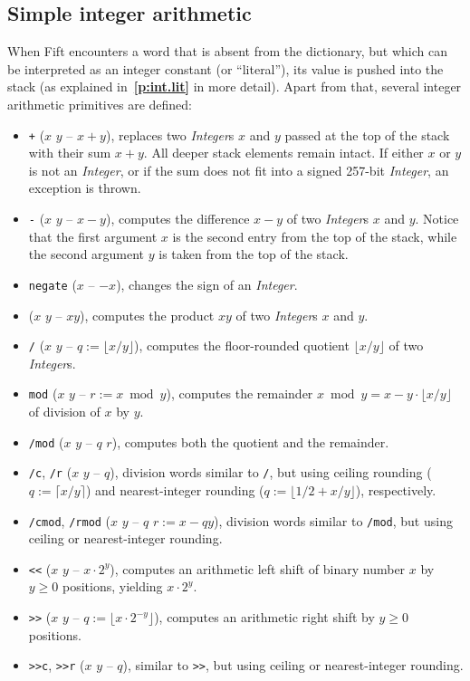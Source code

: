 \documentclass[12pt,oneside]{article}
\def\refpoint#1{{\rm\textbf{\ref{#1}}}}
\let\ptref=\refpoint
\def\mysubsection#1{\subsection{#1}\fancyhead[C]{\small{\textsc{\textrm{\thesubsection.} #1}}}}
\begin{document}
\mysubsection{Simple integer arithmetic}\label{p:arith.op}
When Fift encounters a word that is absent from the dictionary, but which can be interpreted as an integer constant (or ``literal''), its value is pushed into the stack (as explained in~\ptref{p:int.lit} in more detail). Apart from that, several integer arithmetic primitives are defined:
\begin{itemize}
\item {\tt +} ($x$ $y$ -- $x+y$), replaces two {\em Integer\/}s $x$ and $y$ passed at the top of the stack with their sum $x+y$. All deeper stack elements remain intact. If either $x$ or $y$ is not an {\em Integer}, or if the sum does not fit into a signed 257-bit {\em Integer}, an exception is thrown.
\item {\tt -} ($x$ $y$ -- $x-y$), computes the difference $x-y$ of two {\em Integer\/}s $x$ and $y$. Notice that the first argument $x$ is the second entry from the top of the stack, while the second argument $y$ is taken from the top of the stack.
\item {\tt negate} ($x$ -- $-x$), changes the sign of an {\em Integer}.
\item {\tt *} ($x$ $y$ -- $xy$), computes the product $xy$ of two {\em Integer\/}s $x$ and $y$.
\item {\tt /} ($x$ $y$ -- $q:=\lfloor x/y\rfloor$), computes the floor-rounded quotient $\lfloor x/y\rfloor$ of two {\em Integer\/}s.
\item {\tt mod} ($x$ $y$ -- $r:=x\bmod y$), computes the remainder $x\bmod y=x-y\cdot\lfloor x/y\rfloor$ of division of $x$ by $y$.
\item {\tt /mod} ($x$ $y$ -- $q$ $r$), computes both the quotient and the remainder.
\item {\tt /c}, {\tt /r} ($x$ $y$ -- $q$), division words similar to {\tt /}, but using ceiling rounding ($q:=\lceil x/y\rceil$) and nearest-integer rounding ($q:=\lfloor 1/2+x/y\rfloor$), respectively.
\item {\tt /cmod}, {\tt /rmod} ($x$ $y$ -- $q$ $r:=x-qy$), division words similar to {\tt /mod}, but using ceiling or nearest-integer rounding.
\item {\tt <{}<} ($x$ $y$ -- $x\cdot 2^y$), computes an arithmetic left shift of binary number $x$ by $y\geq0$ positions, yielding $x\cdot 2^y$.
\item {\tt >{}>} ($x$ $y$ -- $q:=\lfloor x\cdot 2^{-y}\rfloor$), computes an arithmetic right shift by $y\geq0$ positions.
\item {\tt >{}>c}, {\tt >{}>r} ($x$ $y$ -- $q$), similar to {\tt >{}>}, but using ceiling or nearest-integer rounding.

\end{itemize}
\end{document}
